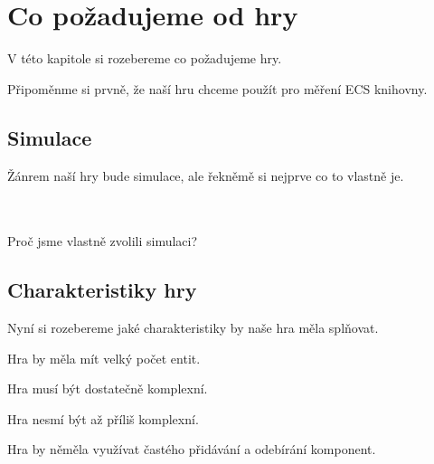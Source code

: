 \chapter{Co požadujeme od hry}

V této kapitole si rozebereme co požadujeme hry.

Připoměnme si prvně, že naší hru chceme použít pro měření ECS knihovny.

\section{Simulace}
Žánrem naší hry bude simulace, ale řekněmě si nejprve co to vlastně je.

\\
\\

Proč jsme vlastně zvolili simulaci?


\section{Charakteristiky hry}
Nyní si rozebereme jaké charakteristiky by naše hra měla splňovat.

Hra by měla mít velký počet entit.

Hra musí být dostatečně komplexní.

Hra nesmí být až příliš komplexní.

Hra by něměla využívat častého přidávání a odebírání komponent.

